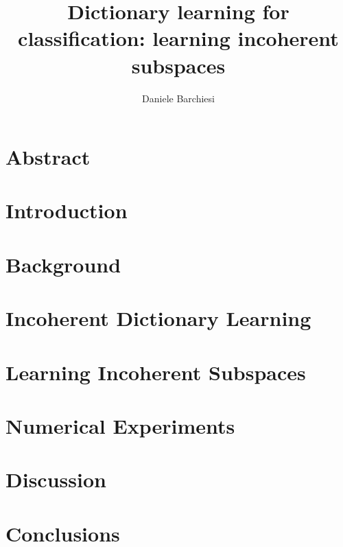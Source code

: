 \documentclass[]{article}
\author{Daniele Barchiesi}
\date{}
\title{Dictionary learning for classification: learning incoherent subspaces}
\begin{document}
\maketitle

\section{Abstract}
\label{sec-1}
\section{Introduction}
\label{sec-2}
\section{Background}
\label{sec-3}
\section{Incoherent Dictionary Learning}
\label{sec-4}
\section{Learning Incoherent Subspaces}
\label{sec-5}
\section{Numerical Experiments}
\label{sec-6}
\section{Discussion}
\label{sec-7}
\section{Conclusions}
\label{sec-8}
\end{document}

